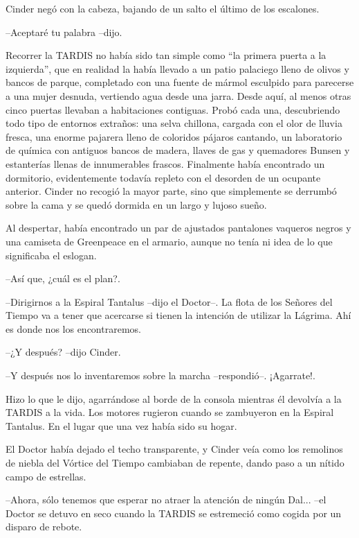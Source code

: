 Cinder negó con la cabeza, bajando de un salto el último de los escalones. 



--Aceptaré tu palabra --dijo.



Recorrer la TARDIS no había sido tan simple como ``la primera puerta a la izquierda'', que en realidad la había llevado a un patio palaciego lleno de olivos y bancos de parque, completado con una fuente de mármol esculpido para parecerse a una mujer desnuda, vertiendo agua desde una jarra. Desde aquí, al menos otras cinco puertas llevaban a habitaciones contiguas. Probó cada una, descubriendo todo tipo de entornos extraños: una selva chillona, cargada con el olor de lluvia fresca, una enorme pajarera lleno de coloridos pájaros cantando, un laboratorio de química con antiguos bancos de madera, llaves de gas y quemadores Bunsen y estanterías llenas de innumerables frascos. Finalmente había encontrado un dormitorio, evidentemente todavía repleto con el desorden de un ocupante anterior. Cinder no recogió la mayor parte, sino que simplemente se derrumbó sobre la cama y se quedó dormida en un largo y lujoso sueño.

Al despertar, había encontrado un par de ajustados pantalones vaqueros negros y una camiseta de Greenpeace en el armario, aunque no tenía ni idea de lo que significaba el eslogan.



--Así que, ¿cuál es el plan?.

--Dirigirnos a la Espiral Tantalus --dijo el Doctor--. La flota de los Señores del Tiempo va a tener que acercarse si tienen la intención de utilizar la Lágrima. Ahí es donde nos los encontraremos.

--¿Y después? --dijo Cinder.

--Y después nos lo inventaremos sobre la marcha --respondió--. ¡Agarrate!.



Hizo lo que le dijo, agarrándose al borde de la consola mientras él devolvía a la TARDIS a la vida. Los motores rugieron cuando se zambuyeron en la Espiral Tantalus. En el lugar que una vez había sido su hogar.

El Doctor había dejado el techo transparente, y Cinder veía como los remolinos de niebla del Vórtice del Tiempo cambiaban de repente, dando paso a un nítido campo de estrellas.



--Ahora, sólo tenemos que esperar no atraer la atención de ningún Dal... --el Doctor se detuvo en seco cuando la TARDIS se estremeció como cogida por un disparo de rebote.

